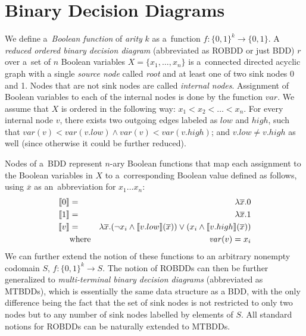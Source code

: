  \section{Binary Decision Diagrams}\label{bdd}

We define a~\emph{Boolean function} of \emph{arity} $k$ as a~function $f :
\{0,1\}^k \to \{0,1\}$. A \emph{reduced ordered binary decision
diagram} (abbreviated as ROBDD or just BDD) $r$ over a~set of $n$ Boolean
variables $X = \{x_1,\ldots,x_n\}$ is a~connected directed acyclic graph with a
single \emph{source node} called \emph{root} and at least one of two sink nodes
0 and 1. Nodes that are not sink nodes are called \emph{internal nodes}.
Assignment of Boolean variables to each of the internal nodes is done by the
function $\mathit{var}$. We assume that $X$ is ordered in the following way:
$x_1 < x_2 < \ldots < x_n$.
For every internal node $v$, there exists two outgoing edges labeled as $low$
and $\mathit{high}$, such that $\mathit{var}(v) < \mathit{var}(v.low) \wedge \mathit{var}(v) <
\mathit{var}(v.high)$; and $v.low \neq v.high$ as well (since otherwise it could be further reduced).

Nodes of a~BDD represent $n$-ary Boolean functions that map each assignment to
the Boolean variables in $X$ to a~corresponding Boolean value defined as
follows, using $\overline{x}$ as an~abbreviation for $x_1\ldots x_n$:
\begin{eqnarray*}
 \text{\textlbrackdbl} 0\text{\textrbrackdbl} & = & \lambda\overline{x}.0\\
 \text{\textlbrackdbl} 1\text{\textrbrackdbl} & = & \lambda\overline{x}.1\\
 \text{\textlbrackdbl} v\text{\textrbrackdbl} & = & \lambda\overline{x}.(\neg
 x_i \wedge \text{\textlbrackdbl} v.low\text{\textrbrackdbl}(\overline{x})) \vee
 (x_i \wedge \text{\textlbrackdbl} v.high\text{\textrbrackdbl}(\overline{x}))\\
       & \text{where} & \mathit{var}(v) = x_i
\end{eqnarray*}
\newpage
We can further extend the notion of these functions to an arbitrary nonempty
codomain $S$, $f : \{0,1\}^k \longrightarrow
S$.
The notion of ROBDDs can then be further generalized to \emph{multi-terminal
binary decision diagrams} (abbreviated as MTBDDs), which is essentially the same data
structure as a BDD, with the only difference being the fact that the set of
sink nodes is not restricted to only two nodes but to any number of sink nodes
labelled by elements of $S$. All standard notions for ROBDDs can be naturally
extended to MTBDDs.

